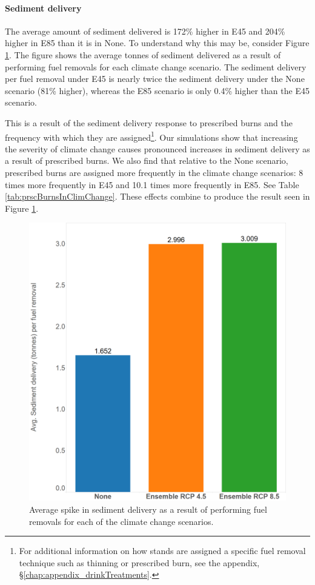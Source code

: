 \paragraph{Sediment delivery} 
The average amount of sediment delivered is 172\% higher in E45 and 204\% higher in E85 than it is in None. To understand why this may be, consider Figure \ref{fig:avgSedimentDelivery}. The figure shows the average tonnes of sediment delivered as a result of performing fuel removals for each climate change scenario. The sediment delivery per fuel removal under E45 is nearly twice the sediment delivery under the None scenario (81\% higher), whereas the E85 scenario is only 0.4\% higher than the E45 scenario.

This is a result of the sediment delivery response to prescribed burns and the frequency with which they are assigned\footnote{For additional information on how stands are assigned a specific fuel removal technique such as thinning or prescribed burn, see the appendix, \S \ref{chap:appendix_drinkTreatments}.}. Our simulations show that increasing the severity of climate change causes pronounced increases in sediment delivery as a result of prescribed burns. We also find that relative to the None scenario, prescribed burns are assigned more frequently in the climate change scenarios: 8 times more frequently in E45 and 10.1 times more frequently in E85. See Table \ref{tab:prscBurnsInClimChange}. These effects combine to produce the result seen in Figure \ref{fig:avgSedimentDelivery}.

\begin{figure}[ht]
\centering
\includegraphics[width=.55\textwidth]{../images/AvgSedimentSpikes}
\caption[Average sediment delivery across climate scenarios]{Average spike in sediment delivery as a result of performing fuel removals for each of the climate change scenarios.}
\label{fig:avgSedimentDelivery}
\end{figure}

